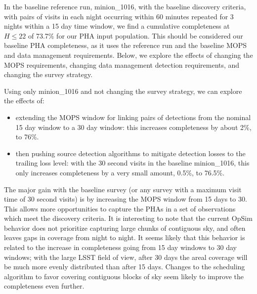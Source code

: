 In the baseline reference run, minion\_1016, with the baseline discovery criteria, with pairs of visits in each night occurring within 60 minutes repeated for 3 nights within a 15 day time window, we find a cumulative completeness at $H\le22$ of 73.7\% for our PHA input population. This should be considered our baseline PHA completeness, as it uses the reference run and the baseline MOPS and data management requirements. Below, we explore the effects of changing the MOPS requirements, changing data management detection requirements, and changing the survey strategy. 

Using only minion\_1016 and not changing the survey strategy, we can explore the effects of:
\begin{itemize}
\item extending the MOPS window for linking pairs of detections from the nominal 15 day window to a 30 day window: this increases completeness by about 2\%, to 76\%.
\item then pushing source detection algorithms to mitigate detection losses to the trailing loss level: with the 30 second visits in the baseline minion\_1016, this only increases completeness by a very small amount, 0.5\%, to 76.5\%.
\end{itemize}

The major gain with the baseline survey (or any survey with a maximum visit time of 30 second visits) is by increasing the MOPS window from 15 days to 30. This allows more opportunities to capture the PHAs in a set of observations which meet the discovery criteria. It is interesting to note that the current OpSim behavior does not prioritize capturing large chunks of contiguous sky, and often leaves gaps in coverage from night to night. It seems likely that this behavior is related to the increase in completeness going from 15 day windows to 30 day windows; with the large LSST field of view, after 30 days the areal coverage will be much more evenly distributed than after 15 days. Changes to the scheduling algorithm to favor covering contiguous blocks of sky seem likely to improve the completeness even further. 

